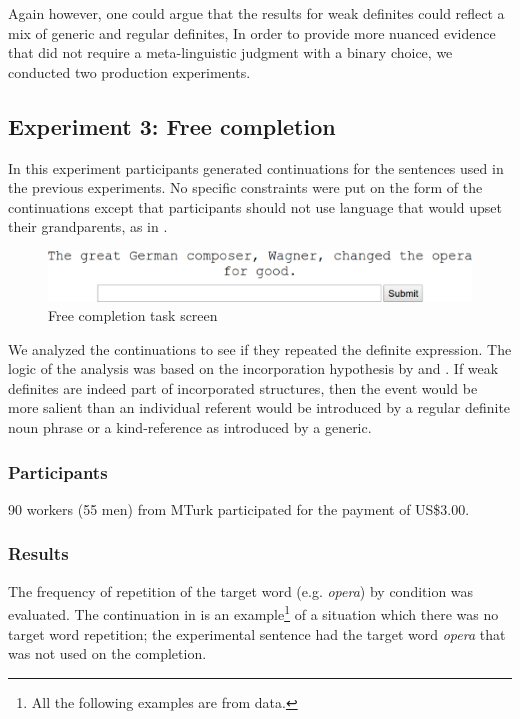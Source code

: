\documentclass[output=paper,
modfonts
]{langscibook}
\begin{document}
Again however, one could argue that the results for weak definites could reflect a mix of generic and regular definites,  In order to provide more nuanced evidence that did not require a meta-linguistic judgment with a binary choice, we conducted two production experiments. 

\subsection{Experiment 3: Free completion} 

In this experiment participants generated continuations for the sentences used in the previous experiments. No specific constraints were put on the form of the continuations except that participants should not use language that would upset their grandparents, as in .


\begin{figure}[H]
\centering
\includegraphics[width=1\textwidth]{figures/fig_compinput}
\caption{Free completion task screen}
\label{fig:desaetal:8}
\end{figure}

We analyzed the continuations to see if they repeated the definite expression. The logic of the analysis was based on the incorporation hypothesis by \citet{CarlsonEtAlii2013} and \citet{KleinEtAlii2013}. If weak definites are indeed part of incorporated structures, then the event would be more salient than an individual referent would be introduced by a regular definite noun phrase or a kind-reference as introduced by a generic.

\subsubsection{Participants}
90 workers (55 men) from MTurk participated for the payment of US\$3.00. 

\subsubsection{Results}

The frequency of repetition of the target word (e.g. \textit{opera}) by condition was evaluated. The continuation in  is an example\footnote{All the following examples are from data.} of a situation which there was no target word repetition; the experimental sentence had the target word  \textit{opera} that was not used on the completion. 
\end{document}
